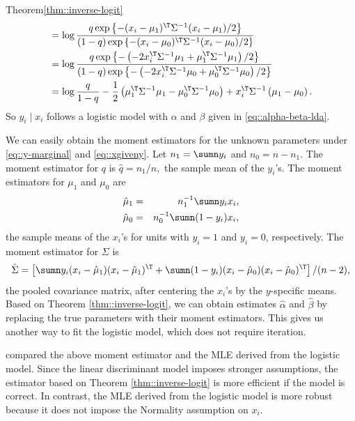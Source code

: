 \begin{myproof}{Theorem}{\ref{thm::inverse-logit}}
\begin{align*}
&=\log \frac{q\exp\left\{ -(x_{i}-\mu_{1})^{\T}\Sigma^{-1}(x_{i}-\mu_{1})/2\right\}}
{  (1-q) \exp\left\{ -(x_{i}-\mu_{0})^{\T}\Sigma^{-1}(x_{i}-\mu_{0})/2\right\}  }\\
& =\log\frac{q\exp\left\{ -\left(-2x_{i}^{\T}\Sigma^{-1}\mu_{1}+\mu_{1}^{\T}\Sigma^{-1}\mu_{1}\right)/2\right\} }{(1-q)\exp\left\{ -\left(-2x_{i}^{\T}\Sigma^{-1}\mu_{0}+\mu_{0}^{\T}\Sigma^{-1}\mu_{0}\right)/2\right\} }\\
 & = \log\frac{q}{1-q}-\frac{1}{2}\left(\mu_{1}^{\T}\Sigma^{-1}\mu_{1}-\mu_{0}^{\T}\Sigma^{-1}\mu_{0}\right)+x_{i}^{\T}\Sigma^{-1}\left(\mu_{1}-\mu_{0}\right) . 
\end{align*}
So $y_{i}\mid x_{i}$ follows a logistic model with
$\alpha$ and $\beta$ given in \eqref{eq::alpha-beta-lda}. 
\end{myproof}


We can easily obtain the moment estimators for the unknown parameters under \eqref{eq::y-marginal} and \eqref{eq::xgiveny}. Let $n_1 = \sumn y_i$ and $n_0 = n-n_1$. The moment estimator for $q$ is 
$
\hat{q} = n_1/n,
$
the sample mean of the $y_i$'s. The moment estimators for $\mu_1$ and $\mu_0$ are
\begin{eqnarray*}
\hat{\mu}_1 &=& n_1^{-1} \sumn  y_i x_i,\\ 
\hat{\mu}_0 &=& n_0^{-1} \sumn (1-y_i) x_i, 
\end{eqnarray*}
the sample means of the $x_i$'s for units with $y_i=1$ and $y_i=0$, respectively. The moment estimator for $\Sigma$ is 
$$
\hat{\Sigma} = \left[ 
\sumn y_i (x_i -\hat{\mu}_1  )(x_i-\hat{\mu}_1 )^{\T} +  \sumn (1-y_i) (x_i -\hat{\mu}_0  )(x_i-\hat{\mu}_0 )^{\T}
\right] /(n-2) ,
$$
the pooled covariance matrix, after centering the $x_i$'s by the $y$-specific means. 
Based on Theorem \ref{thm::inverse-logit}, we can obtain estimates $\hat{\alpha}$ and $\hat{\beta}$ by replacing the true parameters with their moment estimators. This gives us another way to fit the logistic model, which does not require iteration. 



\citet{efron1975efficiency} compared the above moment estimator and the MLE derived from the logistic model. Since the linear discriminant model imposes stronger assumptions, the estimator based on Theorem \ref{thm::inverse-logit} is more efficient if the model is correct. In contrast, the MLE derived from the logistic model is more robust because it does not impose the Normality assumption on $x_i$.   




